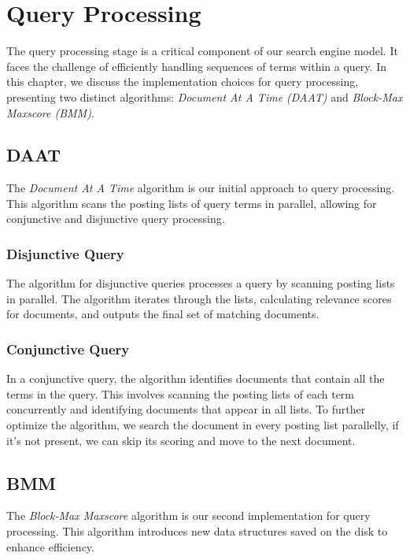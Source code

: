 \chapter{Query Processing}

The query processing stage is a critical component of our search engine model. It faces the challenge of efficiently handling 
sequences of terms within a query. In this chapter, we discuss the implementation choices for query processing, presenting two 
distinct algorithms: \textit{Document At A Time (DAAT)} and \textit{Block-Max Maxscore (BMM)}.

\section{DAAT}

The \textit{Document At A Time} algorithm is our initial approach to query processing. This algorithm scans the posting lists of 
query terms in parallel, allowing for conjunctive and disjunctive query processing.

\subsection{Disjunctive Query}

The algorithm for disjunctive queries processes a query by scanning posting lists in parallel. 
The algorithm iterates through the lists, calculating relevance scores for documents, and outputs the final set of 
matching documents.

\subsection{Conjunctive Query}

In a conjunctive query, the algorithm identifies documents that contain all the terms in the query. This involves scanning the 
posting lists of each term concurrently and identifying documents that appear in all lists. To further optimize the algorithm,
we search the document in every posting list parallelly, if it's not present, we can skip its scoring and move to the next document.

\section{BMM}

The \textit{Block-Max Maxscore} algorithm is our second implementation for query processing. This algorithm introduces new 
data structures saved on the disk to enhance efficiency.

